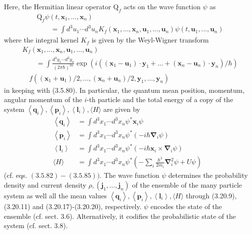 \documentclass{article}
\begin{document}
Here, the Hermitian linear operator $\mathrm{Q}_{f}$ acts on the wave function $\psi$ as
$$
\begin{align*}
& \mathrm{Q}_{f} \psi\left(t, \boldsymbol{x}_{1}, \ldots, \boldsymbol{x}_{n}\right)  \tag{3.20.15}\\
& \qquad=\int d^{3} u_{1} \cdots d^{3} u_{n} K_{f}\left(\boldsymbol{x}_{1}, \ldots, \boldsymbol{x}_{n}, \boldsymbol{u}_{1}, \ldots, \boldsymbol{u}_{n}\right) \psi\left(t, \boldsymbol{u}_{1}, \ldots, \boldsymbol{u}_{n}\right)
\end{align*}
$$
where the integral kernel $K_{f}$ is given by the Weyl-Wigner transform
$$
\begin{align*}
& K_{f}\left(\boldsymbol{x}_{1}, \ldots, \boldsymbol{x}_{n}, \boldsymbol{u}_{1}, \ldots, \boldsymbol{u}_{n}\right)  \tag{3.20.16}\\
& \qquad=\int \frac{d^{3} y_{1} \cdots d^{3} y_{n}}{(2 \pi \hbar)^{3 n}} \exp \left(i\left(\left(\boldsymbol{x}_{1}-\boldsymbol{u}_{1}\right) \cdot \boldsymbol{y}_{1}+\ldots+\left(\boldsymbol{x}_{n}-\boldsymbol{u}_{n}\right) \cdot \boldsymbol{y}_{n}\right) / \hbar\right) \\
& \quad f\left(\left(\boldsymbol{x}_{1}+\boldsymbol{u}_{1}\right) / 2, \ldots,\left(\boldsymbol{x}_{n}+\boldsymbol{u}_{n}\right) / 2, \boldsymbol{y}_{1}, \ldots, \boldsymbol{y}_{n}\right)
\end{align*}
$$
in keeping with (3.5.80). In particular, the quantum mean position, momentum, angular momentum of the $i$-th particle and the total energy of a copy of the system $\left\langle\boldsymbol{q}_{i}\right\rangle,\left\langle\boldsymbol{p}_{i}\right\rangle,\left\langle\boldsymbol{l}_{i}\right\rangle,\langle H\rangle$ are given by
$$
\begin{align*}
\left\langle\boldsymbol{q}_{i}\right\rangle & =\int d^{3} x_{1} \cdots d^{3} x_{n} \psi^{*} \boldsymbol{x}_{i} \psi  \tag{3.20.17}\\
\left\langle\boldsymbol{p}_{i}\right\rangle & =\int d^{3} x_{1} \cdots d^{3} x_{n} \psi^{*}\left(-i \hbar \boldsymbol{\nabla}_{i} \psi\right)  \tag{3.20.18}\\
\left\langle\boldsymbol{l}_{i}\right\rangle & =\int d^{3} x_{1} \cdots d^{3} x_{n} \psi^{*}\left(-i \hbar \boldsymbol{x}_{i} \times \boldsymbol{\nabla}_{i} \psi\right)  \tag{3.20.19}\\
\langle H\rangle & =\int d^{3} x_{1} \cdots d^{3} x_{n} \psi^{*}\left(-\sum_{i} \frac{\hbar^{2}}{2 m_{i}} \boldsymbol{\nabla}_{i}^{2} \psi+U \psi\right) \tag{3.20.20}
\end{align*}
$$
(cf. eqs. $(3.5 .82)-(3.5 .85))$.
The wave function $\psi$ determines the probability density and current density
$\rho,\left(\boldsymbol{j}_{1}, \ldots, \boldsymbol{j}_{n}\right)$ of the ensemble of the many particle system as well all the mean values $\left\langle\boldsymbol{q}_{i}\right\rangle,\left\langle\boldsymbol{p}_{i}\right\rangle,\left\langle\boldsymbol{l}_{i}\right\rangle,\langle H\rangle$ through (3.20.9), (3.20.11) and (3.20.17)-(3.20.20), respectively. $\psi$ encodes the state of the ensemble (cf. sect. 3.6). Alternatively, it codifies the probabilistic state of the system (cf. sect. 3.8).
\end{document}
